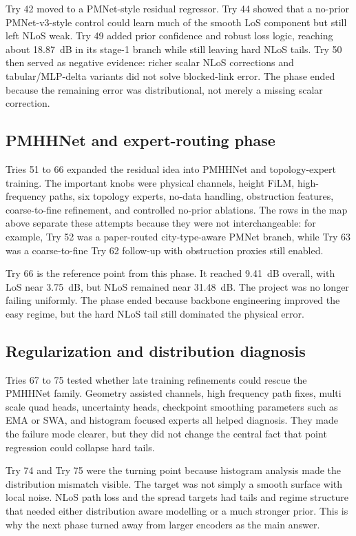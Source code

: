 Try 42 moved to a PMNet-style residual regressor. Try 44 showed that a
no-prior PMNet-v3-style control could learn much of the smooth LoS component
but still left NLoS weak. Try 49 added prior confidence and robust loss logic,
reaching about \SI{18.87}{dB} in its stage-1 branch while still leaving hard
NLoS tails. Try 50 then served as negative evidence: richer scalar NLoS
corrections and tabular/MLP-delta variants did not solve blocked-link error.
The phase ended because the remaining error was distributional, not merely a
missing scalar correction.

\subsection{PMHHNet and expert-routing phase}

Tries 51 to 66 expanded the residual idea into PMHHNet and topology-expert
training. The important knobs were physical channels, height FiLM, high-
frequency paths, six topology experts, no-data handling, obstruction features,
coarse-to-fine refinement, and controlled no-prior ablations. The rows in the
map above separate these attempts because they were not interchangeable: for
example, Try 52 was a paper-routed city-type-aware PMNet branch, while Try 63
was a coarse-to-fine Try 62 follow-up with obstruction proxies still enabled.

Try 66 is the reference point from this phase. It reached \SI{9.41}{dB}
overall, with LoS near \SI{3.75}{dB}, but NLoS remained near
\SI{31.48}{dB}. The project was no longer failing uniformly. The phase ended
because backbone engineering improved the easy regime, but the hard NLoS tail
still dominated the physical error.

\subsection{Regularization and distribution diagnosis}

Tries 67 to 75 tested whether late training refinements could rescue the
PMHHNet family. Geometry assisted channels, high frequency path fixes,
multi scale quad heads, uncertainty heads, checkpoint smoothing parameters such
as EMA or SWA, and histogram focused experts all helped diagnosis. They made
the failure mode clearer, but they did not change the central fact that point
regression could collapse hard tails.

Try 74 and Try 75 were the turning point because histogram analysis made the
distribution mismatch visible. The target was not simply a smooth surface with
local noise. NLoS path loss and the spread targets had tails and regime
structure that needed either distribution aware modelling or a much stronger
prior. This is why the next phase turned away from larger encoders as the main
answer.

